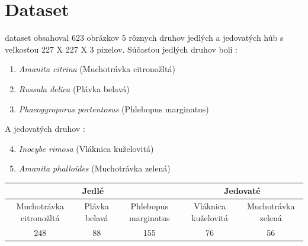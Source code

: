 \documentclass[journal,onecolumn]{IEEEtran}
\begin{document}
\section{Dataset}

 dataset obsahoval 623 obrázkov 5 rôznych druhov jedlých a jedovatých húb s veľkosťou 227 X 227 X 3 pixelov. Súčasťou jedlých druhov boli :
\begin{enumerate}[label=\Alph*]
  \item {\it Amanita citrina} (Muchotrávka citronožltá)
  \item {\it Russula delica} (Plávka belavá)
  \item {\it Phaeogyroporus portentosus} (Phlebopus marginatus)
\end{enumerate}

\IEEEPARstart{}{}
A jedovatých druhov :
\begin{enumerate}[label=\Alph*]
  \setcounter{enumi}{3}
  \item {\it Inocybe rimosa} (Vláknica kuželovitá)
  \item {\it Amanita phalloides} (Muchotrávka zelená)
\end{enumerate}


\begin{center}
{\renewcommand{\arraystretch}{1.5}
\begin{tabular}{ccccc}
\hline
\multicolumn{3}{c}{Jedlé} 
&                                            
\multicolumn{2}{c}{Jedovaté} \\
\hline          
Muchotrávka citronožltá & Plávka belavá & Phlebopus marginatus & Vláknica kuželovitá & Muchotrávka zelená \\
248 & 88 & 155 & 76 & 56
\end{tabular}}
\end{center}
\end{document}
